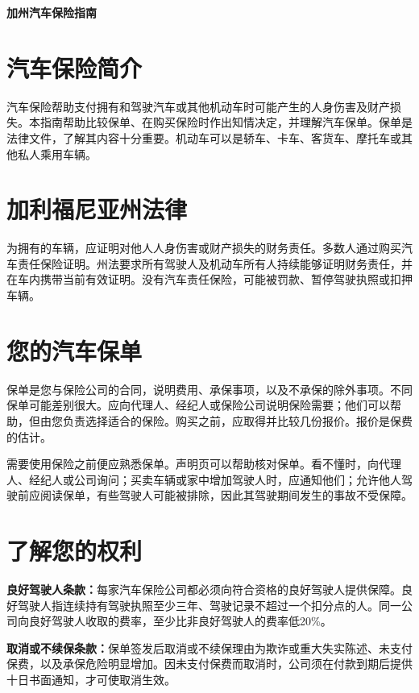 \documentclass[UTF8,fontset=none,11pt,a4paper]{ctexart}
\begin{document}
{\noindent\fontsize{20}{25}\selectfont\bfseries 加州汽车保险指南\par}
\vspace{10pt}
\section*{汽车保险简介}
汽车保险帮助支付拥有和驾驶汽车或其他机动车时可能产生的人身伤害及财产损失。本指南帮助比较保单、在购买保险时作出知情决定，并理解汽车保单。保单是法律文件，了解其内容十分重要。机动车可以是轿车、卡车、客货车、摩托车或其他私人\allowbreak\mbox{乘用车辆。}


\section*{加利福尼亚州法律}
为拥有的车辆，应证明对他人人身伤害或财产损失的财务责任。多数人通过购买汽车责任保险证明。州法要求所有驾驶人及机动车所有人持续能够证明财务责任，并在车内携带当前有效证明。没有汽车责任保险，可能被罚款、暂停驾驶执照或\allowbreak\mbox{扣押车辆。}


\section*{您的汽车保单}
保单是您与保险公司的合同，说明费用、承保事项，以及不承保的除外事项。不同保单可能差别很大。应向代理人、经纪人或保险公司说明保险需要；他们可以帮助，但由您负责选择适合的保险。购买之前，应取得并比较几份报价。报价是保\allowbreak\mbox{费的估计。}


需要使用保险之前便应熟悉保单。声明页可以帮助核对保单。看不懂时，向代理人、经纪人或公司询问；买卖车辆或家中增加驾驶人时，应通知他们；允许他人驾驶前应阅读保单，有些驾驶人可能被排除，因此其驾驶期间发生的事故\allowbreak\mbox{不受保障。}


\section*{了解您的权利}
\textbf{良好驾驶人条款：}每家汽车保险公司都必须向符合资格的良好驾驶人提供保障。良好驾驶人指连续持有驾驶执照至少三年、驾驶记录不超过一个扣分点的人。同一公司向良好驾驶人收取的费率，至少比非良好驾驶人的费率低20\%。


\textbf{取消或不续保条款：}保单签发后取消或不续保理由为欺诈或重大失实陈述、未支付保费，以及承保危险明显增加。因未支付保费而取消时，公司须在付款到期后提供十日书面通知，才可使\allowbreak\mbox{取消生效。}
\end{document}

